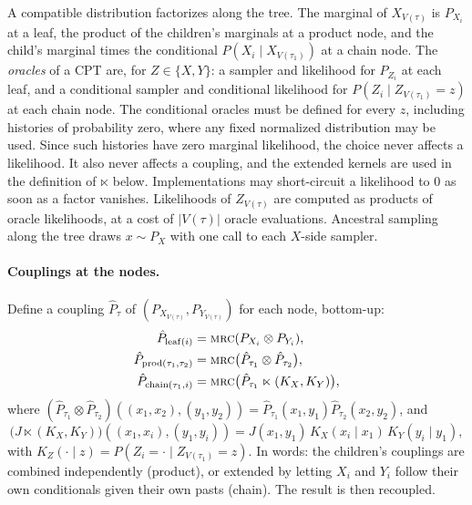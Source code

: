 \documentclass[11pt]{article}
\theoremstyle{definition}
\newcommand{\hP}{\hat P}
\newcommand{\MRC}{\textnormal{\textsc{mrc}}}
\newcommand{\Var}{V}
\begin{document}
A compatible distribution factorizes along the tree. The marginal of
$X_{\Var(\tau)}$ is $P_{X_i}$ at a leaf, the product of the children's
marginals at a product node, and the child's marginal times the conditional
$P(X_i\mid X_{\Var(\tau_1)})$ at a chain node. The \emph{oracles} of a CPT are,
for $Z\in\{X,Y\}$: a sampler and likelihood for $P_{Z_i}$ at each leaf, and a
conditional sampler and conditional likelihood for
$P(Z_i\mid Z_{\Var(\tau_1)}=z)$ at each chain node. The conditional oracles must
be defined for every $z$, including histories of probability zero, where any
fixed normalized distribution may be used. Since such histories have zero
marginal likelihood, the choice never affects a likelihood. It also never
affects a coupling, and the extended kernels are used in the definition of
$\ltimes$ below. Implementations may short-circuit a likelihood to $0$ as soon
as a factor vanishes. Likelihoods of
$Z_{\Var(\tau)}$ are computed as products of oracle likelihoods, at a cost of
$|\Var(\tau)|$ oracle evaluations. Ancestral sampling along the tree draws
$x\sim P_X$ with one call to each $X$-side sampler.

\paragraph{Couplings at the nodes.}
Define a coupling $\hP_\tau$ of $(P_{X_{\Var(\tau)}},P_{Y_{\Var(\tau)}})$ for
each node, bottom-up:
\begin{align*}
  \hP_{\mathrm{leaf}(i)}&=\MRC(P_{X_i}\otimes P_{Y_i}),\\
  \hP_{\mathrm{prod}(\tau_1,\tau_2)}&=\MRC\bigl(\hP_{\tau_1}\otimes\hP_{\tau_2}\bigr),\\
  \hP_{\mathrm{chain}(\tau_1,i)}&=\MRC\bigl(\hP_{\tau_1}\ltimes(K_X,K_Y)\bigr),
\end{align*}
where $(\hP_{\tau_1}\otimes\hP_{\tau_2})((x_1,x_2),(y_1,y_2))=\hP_{\tau_1}(x_1,y_1)\hP_{\tau_2}(x_2,y_2)$, and
\[
  \bigl(J\ltimes(K_X,K_Y)\bigr)((x_1,x_i),(y_1,y_i))=J(x_1,y_1)\,K_X(x_i\mid x_1)\,K_Y(y_i\mid y_1),
\]
with $K_Z(\cdot\mid z)=P(Z_i=\cdot\mid Z_{\Var(\tau_1)}=z)$. In words: the
children's couplings are combined independently (product), or extended by
letting $X_i$ and $Y_i$ follow their own conditionals given their own pasts
(chain). The result is then recoupled.
\end{document}
